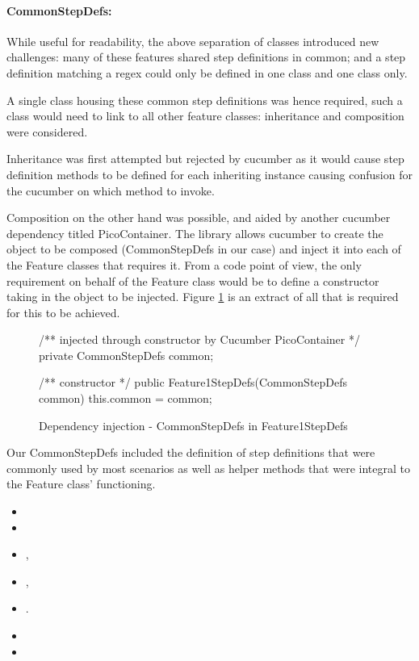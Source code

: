 \paragraph{CommonStepDefs:} 
While useful for readability, the above separation of classes introduced new challenges: many of these features shared step definitions in common; and a step definition matching a regex could only be defined in one class and one class only.
\par 
A single class housing these common step definitions was hence required, such a class would need to link to all other feature classes: inheritance and composition were considered.
\par
Inheritance was first attempted but rejected by cucumber as it would cause step definition methods to be defined for each inheriting instance causing confusion for the cucumber on which method to invoke. 
\par
Composition on the other hand was possible, and aided by another cucumber dependency titled PicoContainer.  The library allows cucumber to create the object to be composed (CommonStepDefs in our case) and inject it into each of the Feature classes that requires it. From a code point of view, the only requirement on behalf of the Feature class would be to define a constructor taking in the object to be injected. Figure \ref{code:cucumber-piccontainer-di} is an extract of all that is required for this to be achieved. 
\begin{figure}[H]
\begin{javacode}
/** injected through constructor by Cucumber PicoContainer */
private CommonStepDefs common;

/** constructor */ 
public Feature1StepDefs(CommonStepDefs common) {
    this.common = common;
}
\end{javacode}
\caption{Dependency injection - CommonStepDefs in Feature1StepDefs}    
\label{code:cucumber-piccontainer-di}
\end{figure}
Our CommonStepDefs included the definition of step definitions that were commonly used by most scenarios as well as helper methods that were integral to the Feature class' functioning. 
\begin{itemize}
    \item {}
    \item {}
    \item {}, 
    \item {}, 
    \item {}.
    \item {}
    \item {}
\end{itemize}

